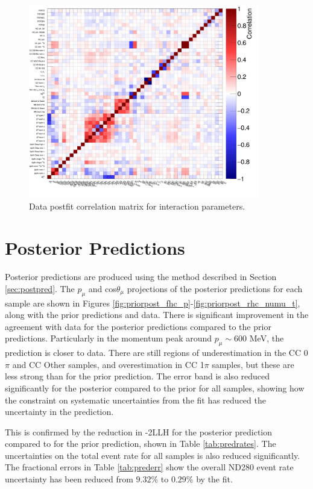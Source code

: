 \begin{figure}[!htbp]
\centering
\includegraphics*[width=0.9\textwidth,clip]{figs/MaCh3DataCorrXsec}
\caption{Data postfit correlation matrix for interaction parameters.}\label{fig:datpostfitcovXsec}
\end{figure}

\section{Posterior Predictions}\label{sec:respostpred}

Posterior predictions are produced using the method described in Section \ref{sec:postpred}. The $p_{\mu}$ and cos$\theta_{\mu}$ projections of the posterior predictions for each sample are shown in Figures \ref{fig:priorpost_fhc_p}-\ref{fig:priorpost_rhc_numu_t}, along with the prior predictions and data. There is significant improvement in the agreement with data for the posterior predictions compared to the prior predictions. Particularly in the momentum peak around $p_{\mu}\sim$600 MeV, the prediction is closer to data. There are still regions of underestimation in the CC 0$\pi$ and CC Other samples, and overestimation in CC 1$\pi$ samples, but these are less strong than for the prior prediction. The error band is also reduced significantly for the posterior compared to the prior for all samples, showing how the constraint on systematic uncertainties from the fit has reduced the uncertainty in the prediction. 

This is confirmed by the reduction in -2LLH for the posterior prediction compared to for the prior prediction, shown in Table \ref{tab:predrates}. The uncertainties on the total event rate for all samples is also reduced significantly. The fractional errors in Table \ref{tab:prederr} show the overall ND280 event rate uncertainty has been reduced from $9.32\%$ to $0.29\%$ by the fit.

